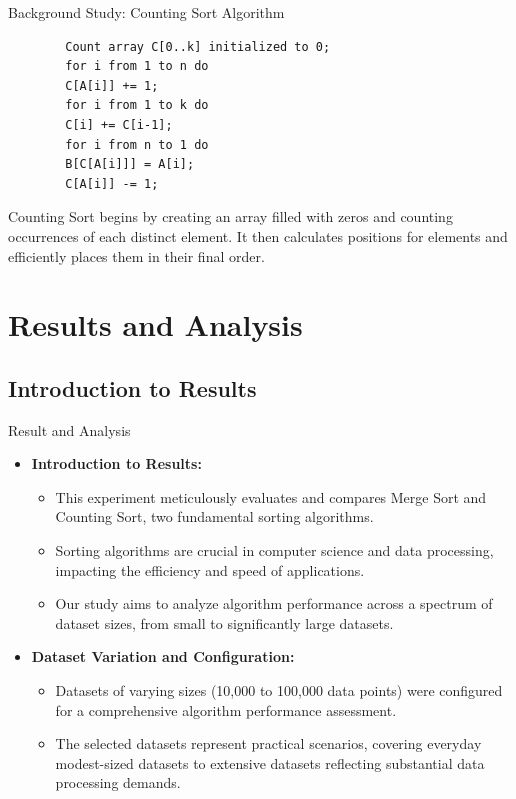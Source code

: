 \documentclass{beamer}
\begin{document}
\begin{frame}[fragile]{Background Study: Counting Sort Algorithm}
	\begin{verbatim}
		Count array C[0..k] initialized to 0;
		for i from 1 to n do
		C[A[i]] += 1;
		for i from 1 to k do
		C[i] += C[i-1];
		for i from n to 1 do
		B[C[A[i]]] = A[i];
		C[A[i]] -= 1;
	\end{verbatim}
	Counting Sort begins by creating an array filled with zeros and counting occurrences of each distinct element. It then calculates positions for elements and efficiently places them in their final order.
\end{frame}

	
\section{Results and Analysis}
\subsection{Introduction to Results}
\begin{frame}{Result and Analysis}
	\begin{itemize}
		
		\item \textbf{Introduction to Results:}
		\begin{itemize}
			\item This experiment meticulously evaluates and compares Merge Sort and Counting Sort, two fundamental sorting algorithms.
			\item Sorting algorithms are crucial in computer science and data processing, impacting the efficiency and speed of applications.
			\item Our study aims to analyze algorithm performance across a spectrum of dataset sizes, from small to significantly large datasets.
		\end{itemize}
		
		\item \textbf{Dataset Variation and Configuration:}
		\begin{itemize}
			\item Datasets of varying sizes (10,000 to 100,000 data points) were configured for a comprehensive algorithm performance assessment.
			\item The selected datasets represent practical scenarios, covering everyday modest-sized datasets to extensive datasets reflecting substantial data processing demands.
		\end{itemize}
	\end{itemize}
	
\end{frame}
\end{document}
